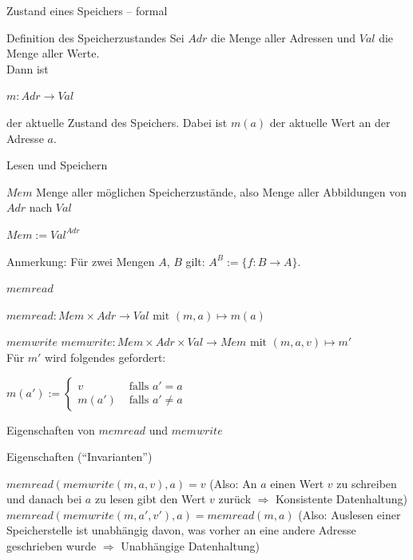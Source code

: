 \documentclass[handout]{beamer}
\begin{document}
\begin{frame}{Zustand eines Speichers -- formal}
	\p\begin{block}{Definition des Speicherzustandes}
		Sei $Adr$ die Menge aller Adressen und $Val$ die Menge aller Werte.\\
		Dann ist \\ \begin{center}
			$m: Adr \rightarrow Val$
		\end{center}
		der aktuelle Zustand des Speichers. Dabei ist $m(a)$ der aktuelle Wert an der Adresse $a$.
	\end{block}
\end{frame}


\begin{frame}{Lesen und Speichern}
	\pause
	\begin{block}{$Mem$}
		Menge aller möglichen Speicherzustände, also Menge aller Abbildungen von $Adr$ nach $Val$
		\begin{center}
			$Mem:= Val^{Adr}$
		\end{center}
	\end{block}
	\p Anmerkung: \p Für zwei Mengen $A$, $B$ gilt\p : $A^B := \{f: B \rightarrow A\}$.\p
	\begin{block}{$memread$}
		\begin{center}
			$memread: Mem \times Adr \rightarrow Val \text{ mit } (m, a) \mapsto m(a)$
		\end{center}
	\end{block}
	\pause
	\begin{block}{$memwrite$}
		$memwrite: Mem \times Adr \times Val \rightarrow Mem \text{ mit } (m, a,v) \mapsto m'$\\
		Für $m'$ wird folgendes gefordert:
		\begin{center}
			$m(a') :=\begin{cases} 
			v& \text{ falls } a' = a\\
			m(a') &\text{ falls } a' \neq a
			\end{cases} $ 
		\end{center}
	\end{block}
\end{frame}

\begin{frame}{Eigenschaften von $memread$ und $memwrite$}
	
	\begin{block}{Eigenschaften (``Invarianten'')}
		\begin{itemize}
			\pitem $memread(memwrite(m,a,v),a) = v$ \p (Also: An $a$ einen Wert $v$ zu schreiben und danach bei $a$ zu lesen gibt den Wert $v$ zurück \p $\Rightarrow$ Konsistente Datenhaltung)
			\pitem $memread(memwrite(m, a', v'),a) = memread(m,a)$ \p (Also: Auslesen einer Speicherstelle ist unabhängig davon, was vorher an eine andere Adresse geschrieben wurde \p $\Rightarrow$ Unabhängige Datenhaltung)
		\end{itemize}
	\end{block}

\end{frame}
\end{document}
